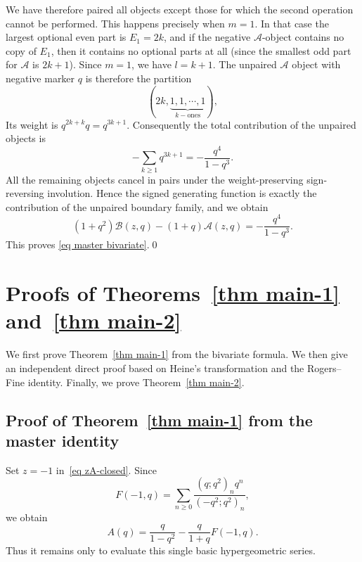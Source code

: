 \documentclass[reqno]{amsart}
\theoremstyle{definition}
\theoremstyle{plain}
\theoremstyle{remark}
\numberwithin{equation}{section}
\newcommand{\fr}{\frac}
\begin{document}
We have therefore paired all objects except those for which the second
operation cannot be performed.  This happens precisely when \(m=1\).  In that
case the largest optional even part is \(E_1=2k\), and if the negative \(\mathcal A\)-object contains no copy of \(E_1\), then it contains no optional parts at all (since the smallest odd part for $\mathcal A$ is $2k+1$).  Since \(m=1\), we have \(l=k+1\).  The unpaired $\mathcal{A}$ object with negative marker $q$ is therefore
the partition
\[
(2k,\underbrace{1,1,\cdots,1}_{k-\text{ones}}),
\]
Its weight is $q^{2k+k}q=q^{3k+1}$. Consequently the total contribution of the unpaired objects is
\[
-\sum_{k\ge1}q^{3k+1}
=
-\frac{q^4}{1-q^3}.
\]
All the remaining objects cancel in pairs under the weight-preserving
sign-reversing involution.  Hence the signed generating function is exactly
the contribution of the unpaired boundary family, and we obtain
\[
(1+q^2)\mathcal B(z,q)-(1+q)\mathcal A(z,q)
=
-\frac{q^4}{1-q^3}.
\]
This proves \eqref{eq master bivariate}.\qed




\section{Proofs of Theorems~\ref{thm main-1} and~\ref{thm main-2}}\label{sec proofs main theorems}
%
We first prove Theorem~\ref{thm main-1} from the bivariate formula.  We then give an independent direct proof based on Heine's transformation and the Rogers--Fine identity.  Finally, we prove Theorem~\ref{thm main-2}.

\subsection{Proof of Theorem~\ref{thm main-1} from the master identity}\label{sec proof main-1}
%
Set $z=-1$ in~\eqref{eq zA-closed}. Since
\[
F(-1,q)=\sum_{n\geq 0}\fr{(q;q^2)_n q^n}{(-q^2;q^2)_n},
\]
we obtain
\begin{equation}\label{eq A-from-F}
A(q)=\fr{q}{1-q^2}-\fr{q}{1+q}F(-1,q).
\end{equation}
Thus it remains only to evaluate this single basic hypergeometric series.
\end{document}
